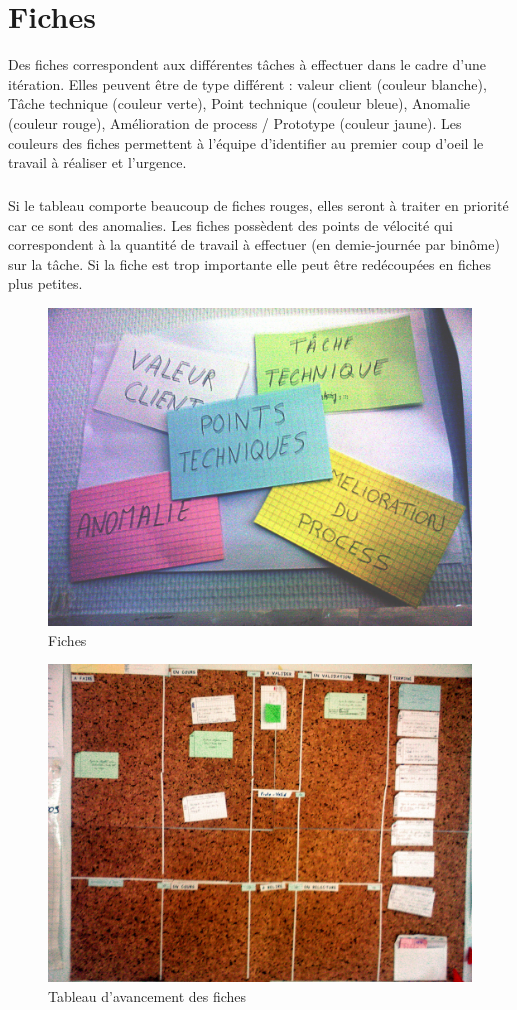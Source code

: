 \section{Fiches}\label{agile:fiches}
Des fiches correspondent aux différentes tâches à effectuer dans le cadre d'une itération. Elles peuvent être de type différent : valeur client (couleur blanche), Tâche technique (couleur verte), Point technique (couleur bleue), Anomalie (couleur rouge), Amélioration de process / Prototype (couleur jaune). Les couleurs des fiches permettent à l'équipe d'identifier au premier coup d'oeil le travail à réaliser et l'urgence. 
\subparagraph*{}
Si le tableau comporte beaucoup de fiches rouges, elles seront à traiter en priorité car ce sont des anomalies. Les fiches possèdent des points de vélocité qui correspondent à la quantité de travail à effectuer (en demie-journée par binôme) sur la tâche. Si la fiche est trop importante elle peut être redécoupées en fiches plus petites.
\begin{figure}[!ht]
\centering
\includegraphics[scale=0.10]{Illustrations/SP_A0185.jpg}
\caption{Fiches}
\label{fig:Fiches}
\end{figure}
\begin{figure}[!ht]
\centering
\includegraphics[scale=0.10]{Illustrations/SP_A0183.jpg}
\caption{Tableau d'avancement des fiches}
\label{fig:Tableau d'avancement des fiches}
\end{figure}
